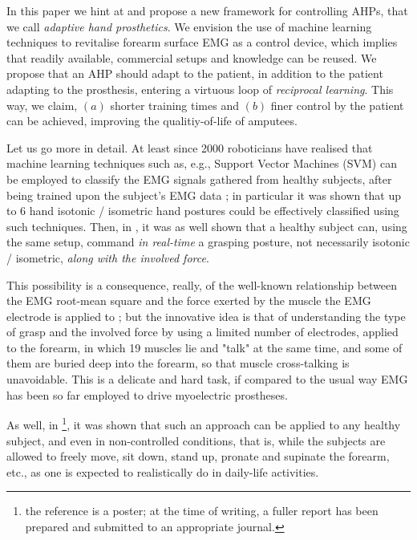 In this paper we hint at and propose a new framework for controlling
AHPs, that we call \emph{adaptive hand prosthetics}. We envision the
use of machine learning techniques to revitalise forearm surface EMG
as a control device, which implies that readily available, commercial
setups and knowledge can be reused. We propose that an AHP should
adapt to the patient, in addition to the patient adapting to the
prosthesis, entering a virtuous loop of \emph{reciprocal
learning}. This way, we claim, $(a)$ shorter training times and $(b)$
finer control by the patient can be achieved, improving the
qualitiy-of-life of amputees.

Let us go more in detail. At least since 2000 roboticians have
realised that machine learning techniques such as, e.g., Support
Vector Machines (SVM) can be employed to classify the EMG signals
gathered from healthy subjects, after being trained upon the subject's
EMG data \cite{smagt,dunlop}; in particular it was shown that up to
$6$ hand isotonic / isometric hand postures could be effectively
classified using such techniques. Then, in
\cite{2008.ICRA,2008.BioCyb}, it was as well shown that a healthy
subject can, using the same setup, command \emph{in real-time} a
grasping posture, not necessarily isotonic / isometric, \emph{along
with the involved force}.

This possibility is a consequence, really, of the well-known
relationship between the EMG root-mean square and the force exerted by
the muscle the EMG electrode is applied to \cite{deluca}; but the
innovative idea is that of understanding the type of grasp and the
involved force by using a limited number of electrodes, applied to the
forearm, in which 19 muscles lie and "talk" at the same time, and some
of them are buried deep into the forearm, so that muscle cross-talking
is unavoidable. This is a delicate and hard task, if compared to the
usual way EMG has been so far employed to drive myoelectric
prostheses.

As well, in \cite{2008.GNB}\footnote{the reference is a poster; at the
time of writing, a fuller report has been prepared and submitted to an
appropriate journal.}, it was shown that such an approach can be
applied to any healthy subject, and even in non-controlled conditions,
that is, while the subjects are allowed to freely move, sit down,
stand up, pronate and supinate the forearm, etc., as one is expected
to realistically do in daily-life activities.

